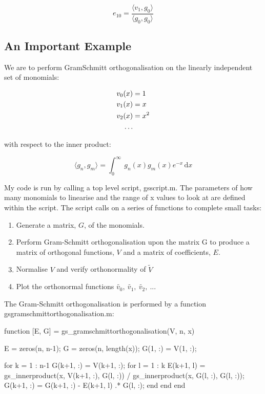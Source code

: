 \documentclass{article}
\begin{document}
$$ e_{10} =  \frac{\langle v_1, g_0 \rangle}{\langle g_0, g_0 \rangle} $$

\subsection{An Important Example}

We are to perform Gram\textunderscore Schmitt orthogonalisation on the linearly independent set of monomials:

$$
\begin{aligned}
v_0(x) &= 1 \\
v_1(x) &= x \\
v_2(x) &= x^2 \\
\ldots
\end{aligned} \\
$$


with respect to the inner product:

$$ 
\langle g_n, g_m \rangle = \int_0^\infty \ g_n(x)g_m(x)e^{-x} \, \mathrm{d}x 
$$

My code is run by calling a top level script, gs\textunderscore script.m. The parameters of how many monomials to linearise and the range of x values to look at are defined within the script. The script calls on a series of functions to complete small tasks:

\begin{enumerate}
  \item Generate a matrix, $G$, of the monomials.
  \item Perform Gram-Schmitt orthogonalisation upon the matrix G to produce a matrix of orthogonal functions, $V$ and a matrix of coefficients, $E$.
  \item Normalise $V$ and verify orthonormality of $\tilde{V}$
  \item Plot the orthonormal functions $\tilde{v_0},\ \tilde{v_1},\ \tilde{v_2},\ ...   $
\end{enumerate}

The Gram-Schmitt orthogonalisation is performed by a function gs\textunderscore gramschmittorthogonalisation.m:


\begin{code}

function [E, G] = gs_gramschmittorthogonalisation(V, n, x)

    E = zeros(n, n-1);			%
    G = zeros(n, length(x));
    G(1, :) = V(1, :);			%

    for k = 1 : n-1
        G(k+1, :) = V(k+1, :);	%
        for l = 1 : k
            E(k+1, l) = gs_innerproduct(x, V(k+1, :), G(l, :)) / gs_innerproduct(x, G(l, :), G(l, :));
            G(k+1, :) = G(k+1, :) -  E(k+1, l) .* G(l, :);
        end
    end
end


\end{code}
\end{document}
